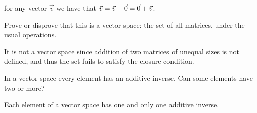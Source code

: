 \begin{exercises}
\begin{answer}
      for any vector \( \vec{v} \) we have that
      \( \vec{v}=\vec{v}+\vec{0}=\vec{0}+\vec{v} \).  
    \end{answer}
  \recommended \item
    Prove or disprove that 
    this is a vector space: the set of all matrices, under
    the usual operations.
    \begin{answer}
      It is not a vector space since addition of two matrices of unequal
      sizes is not defined, and thus the set fails to satisfy the closure
      condition.
    \end{answer}
  \item 
    In a vector space every element has an additive inverse.
    Can some elements have two or more?
    \begin{answer}
      Each element of a vector space has one and only one additive
      inverse.


\end{answer}
\end{exercises}
